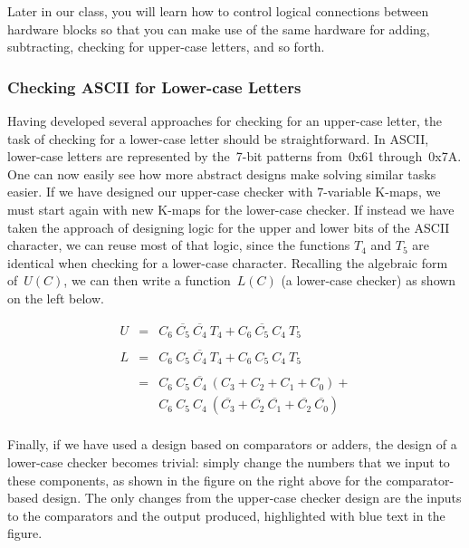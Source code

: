 Later in our class, you will learn how to control logical connections
between hardware blocks so that you can make use of the same hardware
for adding, subtracting, checking for upper-case letters, and so forth.\\

\subsubsection{Checking ASCII for Lower-case Letters}

Having developed several approaches for checking for an upper-case letter,
the task of checking for a lower-case letter should be straightforward.
In ASCII, lower-case letters are represented by the~\mbox{7-bit} patterns 
from~0x61 through~0x7A.
%
One can now easily see how more abstract designs make solving similar
tasks easier.  If we have designed our upper-case checker 
with \mbox{7-variable} K-maps,
we must start again with new K-maps for the lower-case checker.  If
instead we have taken the approach of designing logic for the upper and 
lower bits of the ASCII character, we can reuse most of that logic,
since the functions $T_4$ and $T_5$ are identical when checking for
a lower-case character.  Recalling the algebraic form of~$U(C)$, we can
then write a function~$L(C)$ (a lower-case checker) as shown on the
left below.

\begin{minipage}{2.65in}
\begin{eqnarray*}
U&=&C_6~\overline{C_5}~\overline{C_4}~T_4+C_6~\overline{C_5}~C_4~T_5\\
\\
L&=&C_6~C_5~\overline{C_4}~T_4+C_6~C_5~C_4~T_5\\
\\
&=&C_6~C_5~\overline{C_4}~(C_3+C_2+C_1+C_0)+\\
&&C_6~C_5~C_4~(\overline{C_3}+\overline{C_2}~\overline{C_1}+\overline{C_2}~\overline{C_0})\\
\end{eqnarray*}
\end{minipage}\hspace{0.25in}%
\begin{minipage}{3.6in}
\end{minipage}

Finally, if we have used a design based on comparators or adders, the
design of a lower-case checker becomes trivial: simply change the numbers
that we input to these components, as shown in the figure on the right above
for the comparator-based design.  The only changes from the upper-case checker
design are the inputs to the comparators and the output produced, 
highlighted with blue text in the figure.


